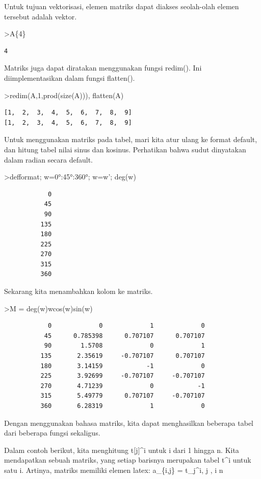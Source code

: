 \documentclass[
]{book}
\begin{document}
Untuk tujuan vektorisasi, elemen matriks dapat diakses seolah-olah elemen tersebut adalah vektor.

\textgreater A\{4\}

\begin{verbatim}
4
\end{verbatim}

Matriks juga dapat diratakan menggunakan fungsi redim(). Ini diimplementasikan dalam fungsi flatten().

\textgreater redim(A,1,prod(size(A))), flatten(A)

\begin{verbatim}
[1,  2,  3,  4,  5,  6,  7,  8,  9]
[1,  2,  3,  4,  5,  6,  7,  8,  9]
\end{verbatim}

Untuk menggunakan matriks pada tabel, mari kita atur ulang ke format default, dan hitung tabel nilai sinus dan kosinus. Perhatikan bahwa sudut dinyatakan dalam radian secara default.

\textgreater defformat; w=0°:45°:360°; w=w'; deg(w)

\begin{verbatim}
            0 
           45 
           90 
          135 
          180 
          225 
          270 
          315 
          360 
\end{verbatim}

Sekarang kita menambahkan kolom ke matriks.

\textgreater M = deg(w)\textbar w\textbar cos(w)\textbar sin(w)

\begin{verbatim}
            0             0             1             0 
           45      0.785398      0.707107      0.707107 
           90        1.5708             0             1 
          135       2.35619     -0.707107      0.707107 
          180       3.14159            -1             0 
          225       3.92699     -0.707107     -0.707107 
          270       4.71239             0            -1 
          315       5.49779      0.707107     -0.707107 
          360       6.28319             1             0 
\end{verbatim}

Dengan menggunakan bahasa matriks, kita dapat menghasilkan beberapa tabel dari beberapa fungsi sekaligus.

Dalam contoh berikut, kita menghitung t{[}j{]}\^{}i untuk i dari 1 hingga n. Kita mendapatkan sebuah matriks, yang setiap barisnya merupakan tabel t\^{}i untuk satu i. Artinya, matriks memiliki elemen latex: a\_\{i,j\} = t\_j\^{}i,  \le j ,  \le i \le n
\end{document}
